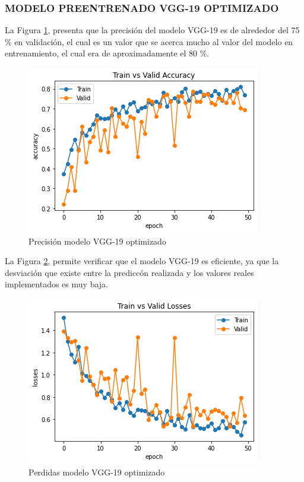 	\subsubsection{\MakeUppercase{Modelo preentrenado VGG-19 optimizado}}
	La Figura \ref{fig:preci_vgg19_OPT}, presenta que la precisión del modelo VGG-19 es de alrededor del 75 \% en validación, el cual es un valor que se acerca mucho al valor del modelo en entrenamiento, el cual era de aproximadamente el 80 \%.
 		\begin{figure}[ht]
			\centering
			\includegraphics[scale=0.6]{Figs/504.png}
			\caption{Precisión modelo VGG-19 optimizado}
			\label{fig:preci_vgg19_OPT}
		\end{figure}
	
	La Figura \ref{fig:perdda_vgg19_opt}, permite verificar que el modelo VGG-19 es eficiente, ya que la desviación que existe entre la prediccón realizada y los valores reales implementados es muy baja.
	
		\newpage
		\begin{figure}[ht]
			\centering
			\includegraphics[scale=0.6]{Figs/505.png}
			\caption{Perdidas modelo VGG-19 optimizado}
			\label{fig:perdda_vgg19_opt}
		\end{figure}
	
